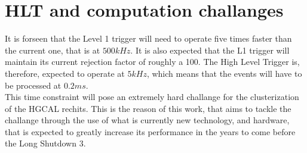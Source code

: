 \section{HLT and computation challanges}
It is forseen that the Level 1 trigger will need to operate five times faster than the current one, that is at $500 \unit{kHz}$. It is also expected that the L1 trigger will maintain its current rejection factor of roughly a 100. The High Level Trigger is, therefore, expected to operate at $5 \unit{kHz}$, which means that the events will have to be processed at $0.2 \unit{ms}$.\\
This time constraint will pose an extremely hard challange for the clusterization of the HGCAL rechits. This is the reason of this work, that aims to tackle the challange through the use of what is currently new technology, and hardware, that is expected to greatly increase its performance in the years to come before the Long Shutdown 3.

